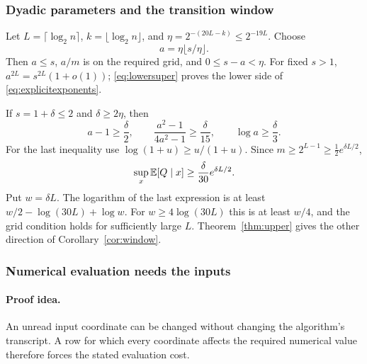 \subsubsection{Dyadic parameters and the transition window}

Let \(L=\lceil\log_2n\rceil\), \(k=\lfloor\log_2n\rfloor\),
and \(\eta=2^{-(20L-k)}\le2^{-19L}\).
Choose
\begin{equation}\label{eq:dyadicgain}
a=\eta\lfloor s/\eta\rfloor.
\end{equation}
Then \(a\le s\), \(a/m\) is on the required grid, and
\(0\le s-a<\eta\).
For fixed \(s>1\), \(a^{2L}=s^{2L}(1+o(1))\);
\eqref{eq:lowersuper} proves the lower side of
\eqref{eq:explicitexponents}.

If \(s=1+\delta\le2\) and \(\delta\ge2\eta\), then
\[
a-1\ge\frac\delta2,\qquad
\frac{a^2-1}{4a^2-1}\ge\frac{\delta}{15},\qquad
\log a\ge\frac{\delta}{3}.
\]
For the last inequality use
\(\log(1+u)\ge u/(1+u)\).
Since \(m\ge2^{L-1}\ge\frac12e^{\delta L/2}\),
\begin{equation}\label{eq:windowexplicit}
\sup_x\mathbb E[Q\mid x]\ge\frac{\delta}{30}e^{\delta L/2}.
\end{equation}
Put \(w=\delta L\).
The logarithm of the last expression is at least
\(w/2-\log(30L)+\log w\).
For \(w\ge4\log(30L)\) this is at least \(w/4\), and the grid
condition holds for sufficiently large \(L\).
Theorem~\ref{thm:upper} gives the other direction of
Corollary~\ref{cor:window}.

\subsubsection{Numerical evaluation needs the inputs}

\paragraph{Proof idea.}
An unread input coordinate can be changed without changing the algorithm's
transcript. A row for which every coordinate affects the required numerical
value therefore forces the stated evaluation cost.

